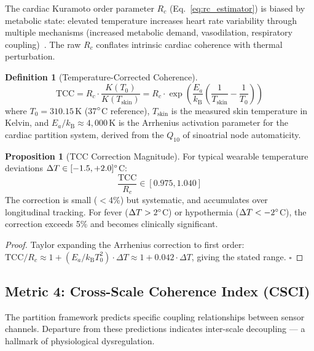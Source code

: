 \documentclass[10pt,twocolumn,a4paper]{article}
\theoremstyle{definition}
\newtheorem{proposition}[theorem]{Proposition}
\newtheorem{definition}{Definition}
\newcommand{\Rc}{R_c}
\newcommand{\kB}{k_{\text{B}}}
\newcommand{\TCC}{\text{TCC}}
\begin{document}
The cardiac Kuramoto order parameter $\Rc$
(Eq.~\ref{eq:rc_estimator}) is biased by metabolic state: elevated
temperature increases heart rate variability through multiple
mechanisms (increased metabolic demand, vasodilation, respiratory
coupling)~\cite{tobaldini2013heart}. The raw $\Rc$ conflates intrinsic
cardiac coherence with thermal perturbation.

\begin{definition}[Temperature-Corrected Coherence]
\label{def:tcc}
\begin{equation}
\label{eq:tcc}
\boxed{
\TCC = \Rc \cdot \frac{K(T_0)}{K(T_{\text{skin}})}
= \Rc \cdot \exp\!\left(\frac{E_a}{\kB}\left(
\frac{1}{T_{\text{skin}}} - \frac{1}{T_0}\right)\right)
}
\end{equation}
where $T_0 = 310.15$\,K (37$\degree$C reference), $T_{\text{skin}}$ is
the measured skin temperature in Kelvin, and $E_a/\kB \approx 4{,}000$\,K
is the Arrhenius activation parameter for the cardiac partition system,
derived from the $Q_{10}$ of sinoatrial node automaticity.
\end{definition}

\begin{proposition}[TCC Correction Magnitude]
\label{prop:tcc_magnitude}
For typical wearable temperature deviations
$\Delta T \in [-1.5, +2.0]\degree$C:
\begin{equation}
\frac{\TCC}{\Rc} \in [0.975, 1.040]
\end{equation}
The correction is small ($<$4\%) but systematic, and accumulates
over longitudinal tracking. For fever ($\Delta T > 2\degree$C) or
hypothermia ($\Delta T < -2\degree$C), the correction exceeds 5\%
and becomes clinically significant.
\end{proposition}

\begin{proof}
Taylor expanding the Arrhenius correction to first order:
$\TCC/\Rc \approx 1 + (E_a/\kB T_0^2) \cdot \Delta T
\approx 1 + 0.042 \cdot \Delta T$, giving the stated range. $\square$
\end{proof}

\subsection{Metric 4: Cross-Scale Coherence Index (CSCI)}

The partition framework predicts specific coupling relationships between
sensor channels. Departure from these predictions indicates inter-scale
decoupling --- a hallmark of physiological dysregulation.
\end{document}

